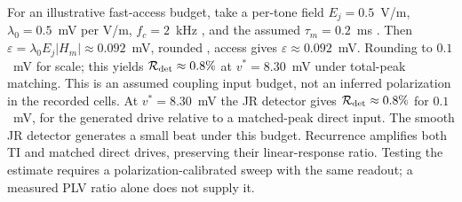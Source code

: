 \documentclass[11pt,a4paper]{article}
\providecommand{\DIFaddtex}[1]{{\protect\color{blue} \sf #1}} %
\providecommand{\DIFdeltex}[1]{{\protect\color{red} \scriptsize #1}} %
\providecommand{\DIFaddbegin}{} %
\providecommand{\DIFaddend}{} %
\providecommand{\DIFdelbegin}{} %
\providecommand{\DIFdelend}{} %
\providecommand{\DIFadd}[1]{\texorpdfstring{\DIFaddtex{#1}}{#1}} %
\providecommand{\DIFdel}[1]{\texorpdfstring{\DIFdeltex{#1}}{}} %
\begin{document}
For \DIFdelbegin \DIFdel{an illustrative fast-access budget, take a per-tone field }\DIFdelend $E_j=0.5$~V/m, $\lambda_0=0.5$~mV per V/m, $f_c=2$~kHz \DIFdelbegin \DIFdel{, }\DIFdelend and the assumed
$\tau_m=0.2$~ms\DIFdelbegin \DIFdel{.
Then $\varepsilon=\lambda_0E_j|H_m|\approx0.092$~mV, rounded }\DIFdelend \DIFaddbegin \DIFadd{, access gives $\varepsilon\approx0.092$~mV. Rounding }\DIFaddend to
$0.1$~mV \DIFdelbegin \DIFdel{for
scale; this }\DIFdelend \DIFaddbegin \DIFadd{yields $\mathcal R_{\rm det}\approx0.8\%$ at $v^*=8.30$~mV
under total-peak matching. This }\DIFaddend is an assumed \DIFdelbegin \DIFdel{coupling }\DIFdelend \DIFaddbegin \DIFadd{input }\DIFaddend budget, not an inferred
polarization in \DIFdelbegin \DIFdel{the }\DIFdelend recorded cells.
\DIFdelbegin \DIFdel{At $v^*=8.30$~mV the JR detector gives
$\mathcal R_{\rm det}\approx0.8\%$ for $0.1$~mV, for the generated drive relative to a matched-peak direct input.
The smooth JR detector generates a small beat under this budget. Recurrence
amplifies both TI and matched direct drives, preserving their linear-response
ratio. Testing the estimate requires a polarization-calibrated sweep with
the same readout; a measured PLV ratio alone does not supply it.
}\DIFdelend
\end{document}
